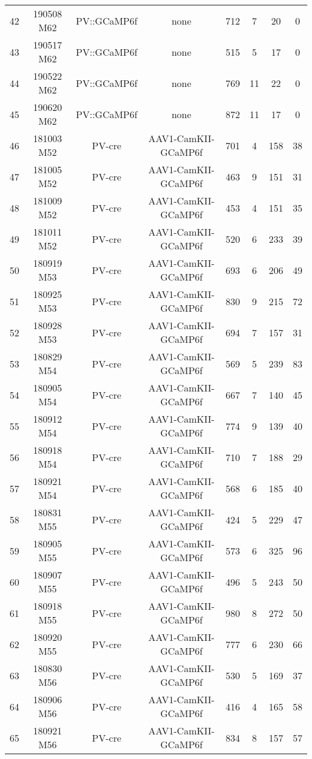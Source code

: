 \begin{table}[htbp]
\begin{tabular}{lccccccc}
    42    & 190508 M62 & PV::GCaMP6f & none  & 712   & 7     & 20    & 0 \\
    43    & 190517 M62 & PV::GCaMP6f & none  & 515   & 5     & 17    & 0 \\
    44    & 190522 M62 & PV::GCaMP6f & none  & 769   & 11    & 22    & 0 \\
    45    & 190620 M62 & PV::GCaMP6f & none  & 872   & 11    & 17    & 0 \\
    46    & 181003 M52 & PV-cre & AAV1-CamKII-GCaMP6f & 701   & 4     & 158   & 38 \\
    47    & 181005 M52 & PV-cre & AAV1-CamKII-GCaMP6f & 463   & 9     & 151   & 31 \\
    48    & 181009 M52 & PV-cre & AAV1-CamKII-GCaMP6f & 453   & 4     & 151   & 35 \\
    49    & 181011 M52 & PV-cre & AAV1-CamKII-GCaMP6f & 520   & 6     & 233   & 39 \\
    50    & 180919 M53 & PV-cre & AAV1-CamKII-GCaMP6f & 693   & 6     & 206   & 49 \\
    51    & 180925 M53 & PV-cre & AAV1-CamKII-GCaMP6f & 830   & 9     & 215   & 72 \\
    52    & 180928 M53 & PV-cre & AAV1-CamKII-GCaMP6f & 694   & 7     & 157   & 31 \\
    53    & 180829 M54 & PV-cre & AAV1-CamKII-GCaMP6f & 569   & 5     & 239   & 83 \\
    54    & 180905 M54 & PV-cre & AAV1-CamKII-GCaMP6f & 667   & 7     & 140   & 45 \\
    55    & 180912 M54 & PV-cre & AAV1-CamKII-GCaMP6f & 774   & 9     & 139   & 40 \\
    56    & 180918 M54 & PV-cre & AAV1-CamKII-GCaMP6f & 710   & 7     & 188   & 29 \\
    57    & 180921 M54 & PV-cre & AAV1-CamKII-GCaMP6f & 568   & 6     & 185   & 40 \\
    58    & 180831 M55 & PV-cre & AAV1-CamKII-GCaMP6f & 424   & 5     & 229   & 47 \\
    59    & 180905 M55 & PV-cre & AAV1-CamKII-GCaMP6f & 573   & 6     & 325   & 96 \\
    60    & 180907 M55 & PV-cre & AAV1-CamKII-GCaMP6f & 496   & 5     & 243   & 50 \\
    61    & 180918 M55 & PV-cre & AAV1-CamKII-GCaMP6f & 980   & 8     & 272   & 50 \\
    62    & 180920 M55 & PV-cre & AAV1-CamKII-GCaMP6f & 777   & 6     & 230   & 66 \\
    63    & 180830 M56 & PV-cre & AAV1-CamKII-GCaMP6f & 530   & 5     & 169   & 37 \\
    64    & 180906 M56 & PV-cre & AAV1-CamKII-GCaMP6f & 416   & 4     & 165   & 58 \\
    65    & 180921 M56 & PV-cre & AAV1-CamKII-GCaMP6f & 834   & 8     & 157   & 57 \\
    \end{tabular}%
  \label{tab:expTable}%
\end{table}%

